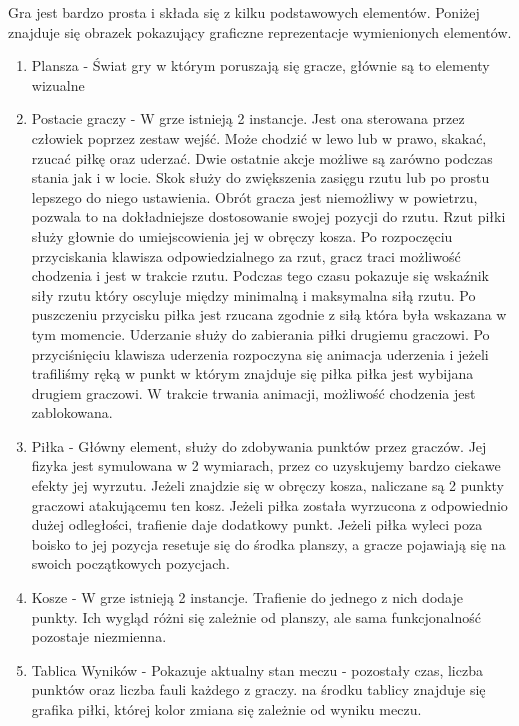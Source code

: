 \documentclass[a4paper,12pt,twoside,openany]{report}
\begin{document}
Gra jest bardzo prosta i składa się z kilku podstawowych elementów.
Poniżej znajduje się obrazek pokazujący graficzne reprezentacje wymienionych elementów.
\begin{enumerate}
    \item Plansza - Świat gry w którym poruszają się gracze, głównie są to elementy wizualne
    \item Postacie graczy - W grze istnieją 2 instancje. Jest ona sterowana przez człowiek poprzez zestaw wejść. Może chodzić w lewo lub w prawo, skakać, rzucać piłkę oraz uderzać. Dwie ostatnie akcje możliwe są zarówno podczas stania jak i w locie. Skok służy do zwiększenia zasięgu rzutu lub po prostu lepszego do niego ustawienia. Obrót gracza jest niemożliwy w powietrzu, pozwala to na dokładniejsze dostosowanie swojej pozycji do rzutu. Rzut piłki służy głownie do umiejscowienia jej w obręczy kosza. Po rozpoczęciu przyciskania klawisza odpowiedzialnego za rzut, gracz traci możliwość chodzenia i jest w trakcie rzutu. Podczas tego czasu pokazuje się wskaźnik siły rzutu który oscyluje między minimalną i maksymalna siłą rzutu. Po puszczeniu przycisku piłka jest rzucana zgodnie z siłą która była wskazana w tym momencie. Uderzanie służy do zabierania piłki drugiemu graczowi. Po przyciśnięciu klawisza uderzenia rozpoczyna się animacja uderzenia i jeżeli trafiliśmy ręką w punkt w którym znajduje się piłka piłka jest wybijana drugiem graczowi. W trakcie trwania animacji, możliwość chodzenia jest zablokowana.
    \item Piłka - Główny element, służy do zdobywania punktów przez graczów. Jej fizyka jest symulowana w 2 wymiarach, przez co uzyskujemy bardzo ciekawe efekty jej wyrzutu. Jeżeli znajdzie się w obręczy kosza, naliczane są 2 punkty graczowi atakującemu ten kosz. Jeżeli piłka została wyrzucona z odpowiednio dużej odległości, trafienie daje dodatkowy punkt. Jeżeli piłka wyleci poza boisko to jej pozycja resetuje się do środka planszy, a gracze pojawiają się na swoich początkowych pozycjach.
    \item Kosze -  W grze istnieją 2 instancje. Trafienie do jednego z nich dodaje punkty. Ich wygląd różni się zależnie od planszy, ale sama funkcjonalność pozostaje niezmienna.
    \item Tablica Wyników - Pokazuje aktualny stan meczu - pozostały czas, liczba punktów oraz liczba fauli każdego z graczy. na środku tablicy znajduje się grafika piłki, której kolor zmiana się zależnie od wyniku meczu.
\end{enumerate}
\end{document}
